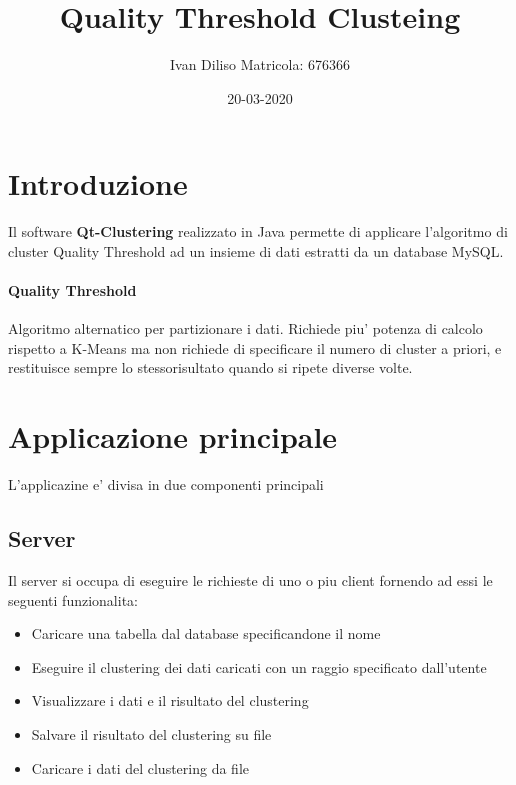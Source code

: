 \documentclass{article}
\title{Quality Threshold Clusteing}
\date{20-03-2020}
\author{Ivan Diliso Matricola: 676366}
\begin{document}
    
    \maketitle
    \tableofcontents
    \newpage
    \section{Introduzione}
    Il software \textbf{Qt-Clustering} realizzato in Java permette di applicare 
    l'algoritmo di cluster Quality Threshold ad un insieme di dati estratti da 
    un database MySQL. 

    \paragraph{Quality Threshold} 
    Algoritmo alternatico per partizionare i dati. Richiede piu' potenza di
    calcolo rispetto a K-Means ma non richiede di specificare il numero di
    cluster a priori, e restituisce sempre lo stessorisultato quando si ripete
    diverse volte.
 
    \section{Applicazione principale}
    L'applicazine e' divisa in due componenti principali
        \subsection{Server}
        Il server si occupa di eseguire le richieste di uno o piu client
        fornendo ad essi le seguenti funzionalita:
            \begin{itemize}
                \item Caricare una tabella dal database specificandone il nome
                \item Eseguire il clustering dei dati caricati con un raggio
                specificato dall'utente
                \item Visualizzare i dati e il risultato del clustering
                \item Salvare il risultato del clustering su file
                \item Caricare i dati del clustering da file
            \end{itemize}
        
        
\end{document}
